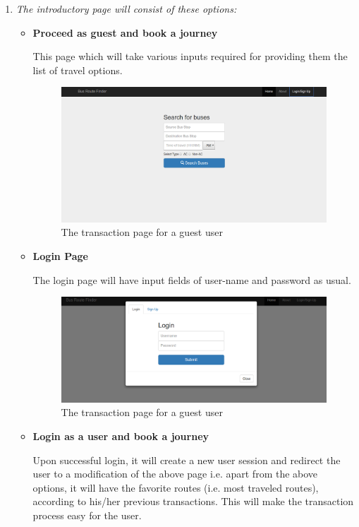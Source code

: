 \documentclass[11pt]{article}
\begin{document}
\begin{enumerate}
\item \textit{The introductory page will consist of these options:}
\begin{itemize}
\item  \textbf{Proceed as guest and book a journey}

This page which will take various inputs required for providing them the list of travel options.

\begin{figure}[ht!]
\center
\includegraphics[scale = 0.36]{shots/guest.png}
\caption{The transaction page for a guest user}
\label{overflow}
\end{figure}


\item \textbf{Login Page}

The login page will have input fields of user-name and password as usual. 

\begin{figure}[ht!]
\center
\includegraphics[scale = 0.4]{shots/login.png}
\caption{The transaction page for a guest user}
\label{overflow}
\end{figure}


\item \textbf{Login as a user and book a journey}

Upon successful login, it will create a new user session and redirect the user to a modification of the above page i.e. apart from the above options, it will have the favorite routes (i.e. most traveled routes), according to his/her previous transactions. This will make the transaction process easy for the user.


\end{itemize}
\end{enumerate}
\end{document}
